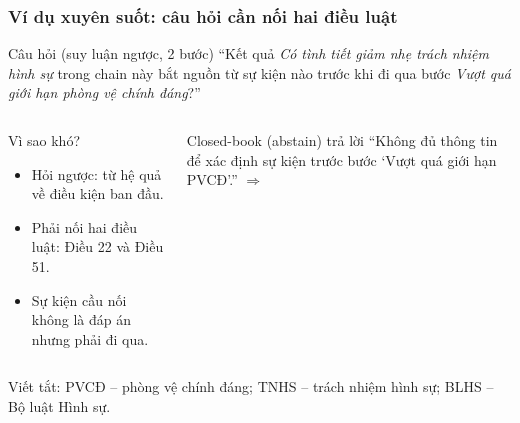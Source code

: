 \begin{frame}
\frametitle{Ví dụ xuyên suốt: câu hỏi cần nối hai điều luật}
\vspace{-0.2cm}
\begin{block}{Câu hỏi \exid{} (suy luận ngược, 2 bước)}
\small ``Kết quả \textit{Có tình tiết giảm nhẹ trách nhiệm hình sự} trong chain này bắt
nguồn từ sự kiện nào trước khi đi qua bước \textit{Vượt quá giới hạn phòng vệ chính đáng}?''
\end{block}

\vspace{0.05cm}
\centering
{}

\vspace{-0.05cm}
\raggedright
\begin{columns}[T,onlytextwidth]
\begin{block}{Vì sao khó?}
\footnotesize
\begin{itemize}
  \item Hỏi ngược: từ hệ quả về điều kiện ban đầu.
  \item Phải nối hai điều luật: Điều 22 và Điều 51.
  \item Sự kiện cầu nối không là đáp án nhưng phải đi qua.
\end{itemize}
\end{block}
\begin{alertblock}{Closed-book (abstain) trả lời}
\footnotesize ``Không đủ thông tin để xác định sự kiện trước bước
`Vượt quá giới hạn PVCĐ'.'' $\Rightarrow$ \labUnc
\end{alertblock}
\end{columns}

\vspace{0.08cm}
{\scriptsize\color{schemaGray} Viết tắt: PVCĐ -- phòng vệ chính đáng; TNHS -- trách nhiệm hình sự; BLHS -- Bộ luật Hình sự.}
\end{frame}

